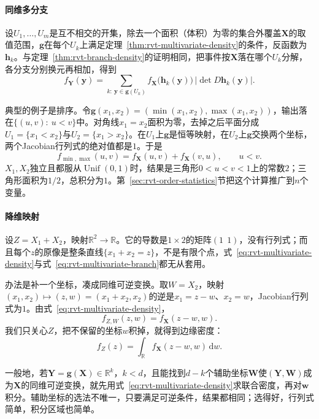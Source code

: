\paragraph{同维多分支}
设$U_1,\ldots,U_m$是互不相交的开集，除去一个面积（体积）为零的集合外覆盖$\bm{X}$的取值范围，$\bm{g}$在每个$U_k$上满足定理~\ref{thm:rvt-multivariate-density}的条件，反函数为$\bm{h}_k$。与定理~\ref{thm:rvt-branch-density}的证明相同，把事件按$\bm{X}$落在哪个$U_k$分解，各分支分别换元再相加，得到
\begin{equation}
 f_{\bm{Y}}(\bm{y})=\sum_{k:\ \bm{y}\in\bm{g}(U_k)}f_{\bm{X}}\bigl(\bm{h}_k(\bm{y})\bigr)\,\bigl\lvert\det D\bm{h}_k(\bm{y})\bigr\rvert .
 \label{eq:rvt-multivariate-branch}
\end{equation}

典型的例子是排序。令$\bm{g}(x_1,x_2)=(\min(x_1,x_2),\max(x_1,x_2))$，输出落在$\{(u,v):\ u<v\}$中。对角线$x_1=x_2$面积为零，去掉之后平面分成$U_1=\{x_1<x_2\}$与$U_2=\{x_1>x_2\}$。在$U_1$上$\bm{g}$是恒等映射，在$U_2$上$\bm{g}$交换两个坐标，两个Jacobian行列式的绝对值都是$1$。于是
\[
 f_{\min,\max}(u,v)=f_{\bm{X}}(u,v)+f_{\bm{X}}(v,u),\qquad u<v .
\]
$X_1,X_2$独立且都服从$\operatorname{Unif}(0,1)$时，结果是三角形$0<u<v<1$上的常数$2$；三角形面积为$1/2$，总积分为$1$。第~\ref{sec:rvt-order-statistics}节把这个计算推广到$n$个变量。

\paragraph{降维映射}
设$Z=X_1+X_2$，映射$\mathbb{R}^2\to\mathbb{R}$。它的导数是$1\times2$的矩阵$(1\ \ 1)$，没有行列式；而且每个$z$的原像是整条直线$\{x_1+x_2=z\}$，不是有限个点，式~\eqref{eq:rvt-multivariate-density}与式~\eqref{eq:rvt-multivariate-branch}都无从套用。

办法是补一个坐标，凑成同维可逆变换。取$W=X_2$，映射$(x_1,x_2)\mapsto(z,w)=(x_1+x_2,x_2)$的逆是$x_1=z-w$、$x_2=w$，Jacobian行列式为$1$。由式~\eqref{eq:rvt-multivariate-density}，
\[
 f_{Z,W}(z,w)=f_{\bm{X}}(z-w,w) .
\]
我们只关心$Z$，把不保留的坐标$w$积掉，就得到边缘密度：
\begin{equation}
 f_Z(z)=\int_{\mathbb{R}}f_{\bm{X}}(z-w,w)\,\mathrm{d}w .
 \label{eq:rvt-sum-completion}
\end{equation}

一般地，若$\bm{Y}=\bm{g}(\bm{X})\in\mathbb{R}^{k}$，$k<d$，且能找到$d-k$个辅助坐标$\bm{W}$使$(\bm{Y},\bm{W})$成为$\bm{X}$的同维可逆变换，就先用式~\eqref{eq:rvt-multivariate-density}求联合密度，再对$\bm{w}$积分。辅助坐标的选法不唯一，只要满足可逆条件，结果都相同；选得好，行列式简单，积分区域也简单。

